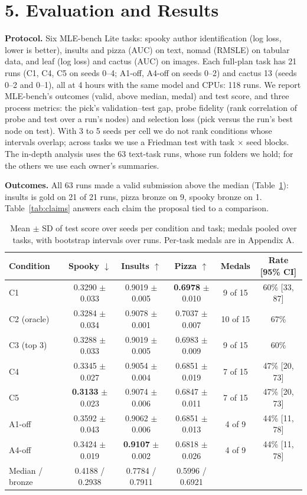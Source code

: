 \documentclass[11pt]{article}
\begin{document}
\section*{5. Evaluation and Results}

\textbf{Protocol.} Six MLE-bench Lite tasks: spooky author identification (log loss,
lower is better), insults and pizza (AUC) on text, nomad (RMSLE) on tabular data, and
leaf (log loss) and cactus (AUC) on images. Each full-plan task has 21 runs
(C1, C4, C5 on seeds 0--4; A1-off, A4-off on seeds 0--2) and cactus 13 (seeds 0--2 and
0--1), all at 4 hours with the same model and CPUs: 118 runs. We report MLE-bench's
outcomes (valid, above median, medal) and test score, and three process metrics: the
pick's validation--test gap, probe fidelity (rank correlation of probe and test over a
run's nodes) and selection loss (pick versus the run's best node on test). With 3 to 5
seeds per cell we do not rank conditions whose intervals overlap; across tasks we use a
Friedman test with task $\times$ seed blocks. The in-depth analysis uses the 63
text-task runs, whose run folders we hold; for the others we use each owner's summaries.

\textbf{Outcomes.} All 63 runs made a valid submission above the median
(Table~\ref{tab:outcomes}): insults is gold on 21 of 21 runs, pizza bronze on 9, spooky
bronze on 1. Table~\ref{tab:claims} answers each claim the proposal tied to a
comparison.

\begin{table}[tb]
\centering
\footnotesize
\begin{tabular}{@{}lccccc@{}}
\toprule
\textbf{Condition} & \textbf{Spooky} $\downarrow$ & \textbf{Insults} $\uparrow$
& \textbf{Pizza} $\uparrow$ & \textbf{Medals} & \textbf{Rate [95\% CI]} \\
\midrule
C1 & 0.3290 $\pm$ 0.033 & 0.9019 $\pm$ 0.005 & \textbf{0.6978} $\pm$ 0.010 & 9 of 15 & 60\% [33, 87] \\
C2 (oracle) & 0.3284 $\pm$ 0.034 & 0.9078 $\pm$ 0.001 & 0.7037 $\pm$ 0.007 & 10 of 15 & 67\% \\
C3 (top 3) & 0.3288 $\pm$ 0.033 & 0.9019 $\pm$ 0.005 & 0.6983 $\pm$ 0.009 & 9 of 15 & 60\% \\
C4 & 0.3345 $\pm$ 0.027 & 0.9054 $\pm$ 0.004 & 0.6851 $\pm$ 0.019 & 7 of 15 & 47\% [20, 73] \\
C5 & \textbf{0.3133} $\pm$ 0.023 & 0.9074 $\pm$ 0.006 & 0.6847 $\pm$ 0.011 & 7 of 15 & 47\% [20, 73] \\
A1-off & 0.3592 $\pm$ 0.043 & 0.9062 $\pm$ 0.006 & 0.6851 $\pm$ 0.013 & 4 of 9 & 44\% [11, 78] \\
A4-off & 0.3424 $\pm$ 0.019 & \textbf{0.9107} $\pm$ 0.002 & 0.6818 $\pm$ 0.026 & 4 of 9 & 44\% [11, 78] \\
\midrule
Median / bronze & 0.4188 / 0.2938 & 0.7784 / 0.7911 & 0.5996 / 0.6921 & & \\
\bottomrule
\end{tabular}
\caption{Mean $\pm$ SD of test score over seeds per condition and task; medals pooled
over tasks, with bootstrap intervals over runs. Per-task medals are in Appendix A.}
\label{tab:outcomes}
\end{table}
\end{document}
